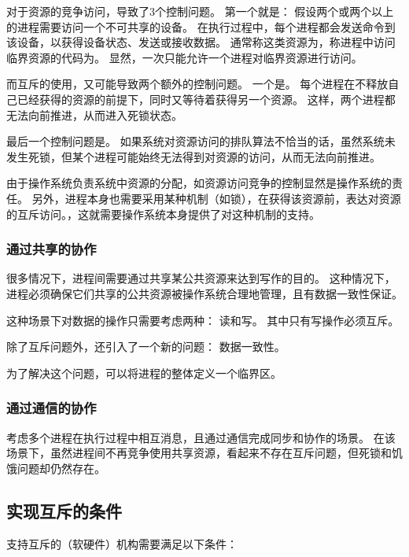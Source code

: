 {{{            对于资源的竞争访问，导致了3个控制问题。
            第一个就是：
            假设两个或两个以上的进程需要访问一个不可共享的设备。
            在执行过程中，每个进程都会发送命令到该设备，以获得设备状态、发送或接收数据。
            通常称这类资源为，称进程中访问临界资源的代码为。
            显然，一次只能允许一个进程对临界资源进行访问。

            而互斥的使用，又可能导致两个额外的控制问题。
            一个是。
            每个进程在不释放自己已经获得的资源的前提下，同时又等待着获得另一个资源。
            这样，两个进程都无法向前推进，从而进入死锁状态。

            最后一个控制问题是。
            如果系统对资源访问的排队算法不恰当的话，虽然系统未发生死锁，但某个进程可能始终无法得到对资源的访问，从而无法向前推进。

            由于操作系统负责系统中资源的分配，如资源访问竞争的控制显然是操作系统的责任。
            另外，进程本身也需要采用某种机制（如锁），在获得该资源前，表达对资源的互斥访问。，这就需要操作系统本身提供了对这种机制的支持。
        }

        \subsubsection{通过共享的协作}
        {
            很多情况下，进程间需要通过共享某公共资源来达到写作的目的。
            这种情况下，进程必须确保它们共享的公共资源被操作系统合理地管理，且有数据一致性保证。

            这种场景下对数据的操作只需要考虑两种：
            读和写。
            其中只有写操作必须互斥。

            除了互斥问题外，还引入了一个新的问题：
            数据一致性。

            为了解决这个问题，可以将进程的整体定义一个临界区。
        }

        \subsubsection{通过通信的协作}
        {
            考虑多个进程在执行过程中相互消息，且通过通信完成同步和协作的场景。
            在该场景下，虽然进程间不再竞争使用共享资源，看起来不存在互斥问题，但死锁和饥饿问题却仍然存在。
        }
    }

    \subsection{实现互斥的条件}
    {
        支持互斥的（软硬件）机构需要满足以下条件：

}}
